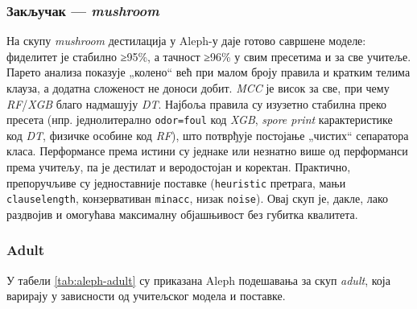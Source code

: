 \subsubsection*{Закључак — \textit{mushroom}}
На скупу \textit{mushroom} дестилација у Aleph-у даје готово савршене моделе: фиделитет је стабилно ≥95\%, а тачност ≥96\% у свим пресетима и за све учитеље. Парето анализа показује „колено“ већ при малом броју правила и кратким телима клауза, а додатна сложеност не доноси добит. \textit{MCC} је висок за све, при чему \textit{RF}/\textit{XGB} благо надмашују \textit{DT}. Најбоља правила су изузетно стабилна преко пресета (нпр. једнолитерално \texttt{odor=foul} код \textit{XGB}, \textit{spore print} карактеристике код \textit{DT}, физичке особине код \textit{RF}), што потврђује постојање „чистих“ сепаратора класа. Перформансе према истини су једнаке или незнатно више од перформанси према учитељу, па је дестилат и веродостојан и коректан. Практично, препоручљиве су једноставније поставке (\texttt{heuristic} претрага, мањи \texttt{clauselength}, конзервативан \texttt{minacc}, низак \texttt{noise}). Овај скуп је, дакле, лако раздвојив и омогућава максималну објашњивост без губитка квалитета.


\subsubsection{Adult}

У табели \ref{tab:aleph-adult} су приказана Aleph подешавања за скуп \textit{adult}, која варирају у зависности од учитељског модела и поставке.

